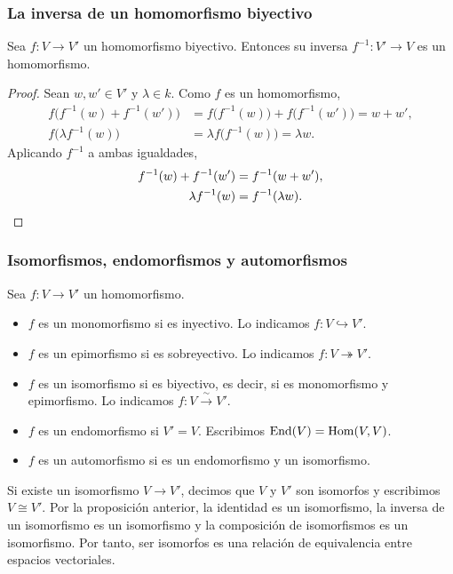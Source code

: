 \begin{frame}
    \frametitle{La inversa de un homomorfismo biyectivo}

    \begin{proposition}
        Sea $f\colon V\to V'$ un homomorfismo biyectivo. Entonces su inversa
        $f^{-1}\colon V'\to V$ es un homomorfismo.
    \end{proposition}

    \begin{proof}
        Sean $w,w'\in V'$ y $\lambda\in k$. Como $f$ es un
        homomorfismo,
        \begin{align*}
            f\bigl(f^{-1}(w)+f^{-1}(w')\bigr)
            &=f\bigl(f^{-1}(w)\bigr)+f\bigl(f^{-1}(w')\bigr)=w+w',\\
            f\bigl(\lambda f^{-1}(w)\bigr)
            &=\lambda f\bigl(f^{-1}(w)\bigr)=\lambda w.
        \end{align*}
        Aplicando $f^{-1}$ a ambas igualdades,
        \begin{align*}
            f^{-1}(w)+f^{-1}(w')&=f^{-1}(w+w'),\\
            \lambda f^{-1}(w)&=f^{-1}(\lambda w).\qedhere
        \end{align*}
    \end{proof}
\end{frame}


\begin{frame}
    \frametitle{Isomorfismos, endomorfismos y automorfismos}

    \begin{definition}
        Sea $f\colon V\to V'$ un homomorfismo.
        \begin{itemize}
            \item $f$ es un \alert{monomorfismo} si es inyectivo. Lo
            indicamos $f\colon V\hookrightarrow V'$.
            \item $f$ es un \alert{epimorfismo} si es sobreyectivo. Lo
            indicamos $f\colon V\twoheadrightarrow V'$.
            \item $f$ es un \alert{isomorfismo} si es biyectivo, es decir,
            si es monomorfismo y epimorfismo. Lo indicamos
            $f\colon V\xrightarrow{\,\sim\,}V'$. 
            \item $f$ es un \alert{endomorfismo} si $V'=V$. Escribimos
            $\operatorname{End}(V)=\operatorname{Hom}(V,V)$.
            \item $f$ es un \alert{automorfismo} si es un endomorfismo y
            un isomorfismo.
        \end{itemize}
    \end{definition}

    \medskip

    Si existe
    un isomorfismo $V\to V'$, decimos que $V$ y $V'$ son
    \alert{isomorfos} y escribimos $V\cong V'$.
    Por la proposición anterior, la identidad es un isomorfismo, la
    inversa de un isomorfismo es un isomorfismo y la composición de
    isomorfismos es un isomorfismo. Por tanto, \alert{ser isomorfos} es
    una relación de equivalencia entre espacios vectoriales.

\end{frame}


